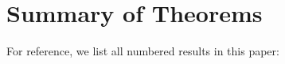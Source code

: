 \documentclass[twocolumn,10pt,a4paper]{article}
\theoremstyle{definition}
\theoremstyle{remark}
\begin{document}

\newpage





\appendix

\section{Summary of Theorems}
\label{app:theorems}

For reference, we list all numbered results in this paper:
\end{document}
